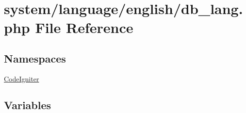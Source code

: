 \hypertarget{db__lang_8php}{}\section{system/language/english/db\+\_\+lang.php File Reference}
\label{db__lang_8php}
\subsection*{Namespaces}
\begin{DoxyCompactItemize}
\item 
 \mbox{\hyperlink{namespace_code_igniter}{Code\+Igniter}}
\end{DoxyCompactItemize}
\subsection*{Variables}
